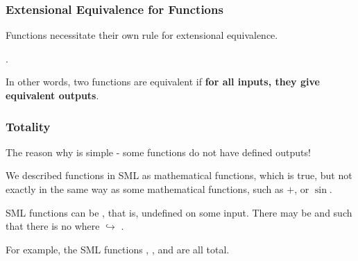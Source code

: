 \documentclass[aspectratio=169]{beamer}
\begin{document}
\begin{frame}[fragile]
  \frametitle{Extensional Equivalence for Functions}

  Functions necessitate their own rule for extensional equivalence.

  \pause
  \vspace{\fill}

  .

  \pause
  \vspace{5pt}

  In other words, two functions are equivalent if \textbf{for all inputs, they give equivalent outputs}.

  \pause
  \vspace{\fill}
  
\end{frame}

\begin{frame}[fragile]
  \frametitle{Totality}

  The reason why is simple - some functions do not have defined outputs!

  \pause
  \vspace{\fill}

  We described functions in SML as mathematical functions, which is true, but not exactly in the
  same way as some mathematical functions, such as $+$, or $\sin$.

  \pause
  \vspace{5pt}

  SML functions can be , that is, undefined on some input. There may be 
  and  such that there is no  where  $\hookrightarrow$ .  

  \pause
  \vspace{\fill}


  \vspace{5pt}

  For example, the SML functions \code{+}, , and \code{^} are all total.
\end{frame}
\end{document}
